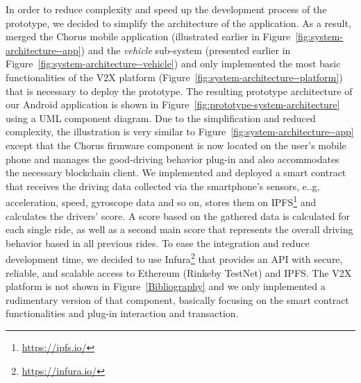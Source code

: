 \documentclass{llncs}
\begin{document}
{			In order to reduce complexity and speed up the development process of the prototype, we decided to simplify the architecture of the application. As a result, merged the Chorus mobile application (illustrated earlier in Figure~\ref{fig:system-architecture--app}) and the \textit{vehicle} sub-system (presented earlier in Figure~\ref{fig:system-architecture--vehicle}) and only implemented the most basic functionalities of the V2X platform (Figure~\ref{fig:system-architecture--platform}) that is necessary to deploy the prototype. The resulting prototype architecture of our Android application is shown in Figure~\ref{fig:prototype-system-architecture} using a UML component diagram. Due to the simplification and reduced complexity, the illustration is very similar to Figure~\ref{fig:system-architecture--app} except that the Chorus firmware component is now located on the user's mobile phone and manages the good-driving behavior plug-in and also accommodates the necessary blockchain client. We implemented and deployed a smart contract that receives the driving data collected via the smartphone's sensors, e..g, acceleration, speed, gyroscope data and so on, stores them on IPFS\footnote{\url{https://ipfs.io/}} and calculates the drivers' score. A score based on the gathered data is calculated for each single ride, as well as a second main score that represents the overall driving behavior based in all previous rides. To ease the integration and reduce development time, we decided to use Infura\footnote{\url{https://infura.io/}} that provides an API with secure, reliable, and scalable access to Ethereum (Rinkeby TestNet) and IPFS. The V2X platform is not shown in Figure~\ref{Bibliography} and we only implemented a rudimentary version of that component, basically focusing on the smart contract functionalities and plug-in interaction and transaction.

}
\end{document}
